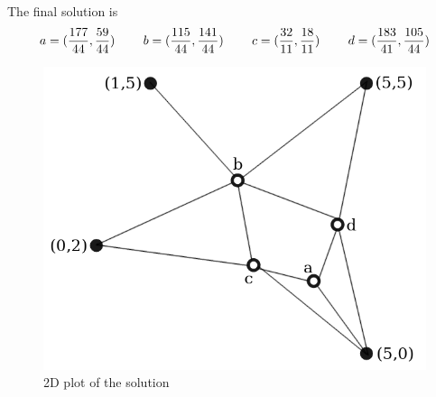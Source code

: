 \documentclass[a4paper, 10pt]{article}
\begin{document}
The final solution is
\[
    a = (\frac{177}{44},\frac{59}{44})\hspace{8mm}b = (\frac{115}{44},\frac{141}{44})\hspace{8mm}c = (\frac{32}{11},\frac{18}{11})\hspace{8mm}d = (\frac{183}{41},\frac{105}{44})    
\]

\begin{figure}[htbp]
    \centering
    \includegraphics[width=0.5\linewidth]{1_qplacement.png}
    \caption{2D plot of the solution}
\end{figure}
\newpage
\end{document}
